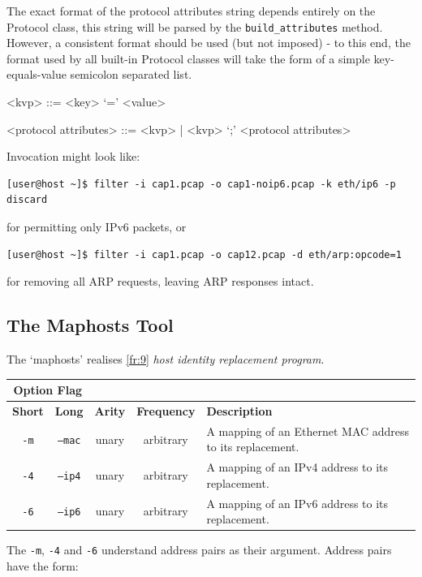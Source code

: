 \documentclass[10pt,a4paper,notitlepage]{report}
\begin{document}
The exact format of the protocol attributes string depends entirely on the Protocol class, this string will be parsed by the \texttt{build_attributes} method. However, a consistent format should be used (but not imposed) - to this end, the format used by all built-in Protocol classes will take the form of a simple key-equals-value semicolon separated list.

\begin{grammar}
<kvp> ::= <key> `=' <value>

<protocol attributes> ::= <kvp> | <kvp> `;' <protocol attributes>
\end{grammar}

Invocation might look like:

\begin{verbatim}
[user@host ~]$ filter -i cap1.pcap -o cap1-noip6.pcap -k eth/ip6 -p discard
\end{verbatim}
for permitting only IPv6 packets, or

\begin{verbatim}
[user@host ~]$ filter -i cap1.pcap -o cap12.pcap -d eth/arp:opcode=1
\end{verbatim}

for removing all ARP requests, leaving ARP responses intact.

\pagebreak
\subsection{The Maphosts Tool}
\label{sec:maphostsdes}
The `maphosts' realises \ref{fr:9} \emph{host identity replacement program}.

\begin{tabularx}{\textwidth}{|c|c|c|c|X|}
\cline{1-2}
\multicolumn{2}{|c|}{\textbf{Option Flag}} & \multicolumn{3}{c}{}\\ \hline
\textbf{Short} & \textbf{Long} & \textbf{Arity} & \textbf{Frequency} & \textbf{Description} \\ \hline
\texttt{-m} & \texttt{--mac} & unary & arbitrary & A mapping of an Ethernet MAC address to its replacement.\\ \hline
\texttt{-4} & \texttt{--ip4} & unary & arbitrary & A mapping of an IPv4 address to its replacement.\\ \hline
\texttt{-6} & \texttt{--ip6} & unary & arbitrary & A mapping of an IPv6 address to its replacement.\\ \hline
\end{tabularx}

The \texttt{-m}, \texttt{-4} and \texttt{-6} understand address pairs as their argument. Address pairs have the form:
\end{document}
